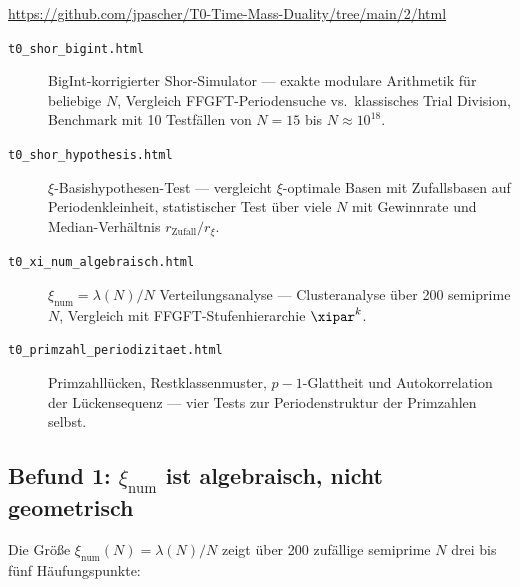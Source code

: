\begin{center}
\url{https://github.com/jpascher/T0-Time-Mass-Duality/tree/main/2/html}
\end{center}

\begin{description}
  \item[\texttt{t0\_shor\_bigint.html}]
    BigInt-korrigierter Shor-Simulator ---
    exakte modulare Arithmetik für beliebige $N$,
    Vergleich FFGFT-Periodensuche vs.\ klassisches Trial Division,
    Benchmark mit 10 Testfällen von $N=15$ bis $N \approx 10^{18}$.

  \item[\texttt{t0\_shor\_hypothesis.html}]
    $\xi$-Basishypothesen-Test ---
    vergleicht $\xi$-optimale Basen mit Zufallsbasen
    auf Periodenkleinheit, statistischer Test über viele $N$
    mit Gewinnrate und Median-Verhältnis $r_\text{Zufall}/r_\xi$.

  \item[\texttt{t0\_xi\_num\_algebraisch.html}]
    $\xi_\text{num} = \lambda(N)/N$ Verteilungsanalyse ---
    Clusteranalyse über 200 semiprime $N$,
    Vergleich mit FFGFT-Stufenhierarchie $\xipar^k$.

  \item[\texttt{t0\_primzahl\_periodizitaet.html}]
    Primzahllücken, Restklassenmuster, $p{-}1$-Glattheit
    und Autokorrelation der Lückensequenz ---
    vier Tests zur Periodenstruktur der Primzahlen selbst.
\end{description}

\subsection{Befund 1: \texorpdfstring{$\xi_\text{num}$}{xi_num} ist algebraisch,
  nicht geometrisch}

Die Größe $\xi_\text{num}(N) = \lambda(N)/N$
zeigt über 200 zufällige semiprime $N$
drei bis fünf Häufungspunkte:

\begin{center}
\end{center}

